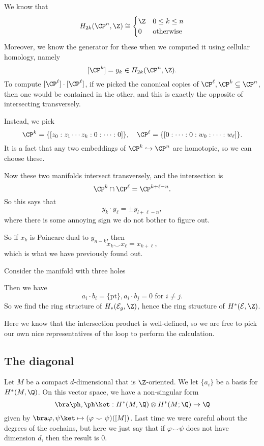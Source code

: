 \documentclass[a4paper]{article}
\begin{document}
\begin{eg}
  We know that
  \[
    H_{2k}(\CP^n, \Z) \cong
    \begin{cases}
      \Z & 0 \leq k \leq n\\
      0 & \text{otherwise}
    \end{cases}
  \]
  Moreover, we know the generator for these when we computed it using cellular homology, namely
  \[
    [\CP^k] = y_k \in H_{2k}(\CP^n, \Z).
  \]
  To compute $[\CP^\ell] \cdot [\CP^\ell]$, if we picked the canonical copies of $\CP^\ell, \CP^k \subseteq \CP^n$, then one would be contained in the other, and this is exactly the opposite of intersecting transversely.

  Instead, we pick
  \[
    \CP^k = \{[z_0:z_1 \cdots z_k:0:\cdots:0]\},\quad \CP^\ell = \{[0:\cdots : 0 : w_0 : \cdots : w_\ell]\}.
  \]
  It is a fact that any two embeddings of $\CP^k \hookrightarrow \CP^n$ are homotopic, so we can choose these.

  Now these two manifolds intersect transversely, and the intersection is
  \[
    \CP^k \cap \CP^\ell = \CP^{k + \ell - n}.
  \]
  So this says that
  \[
    y_k \cdot y_\ell = \pm y_{l + \ell - n},
  \]
  where there is some annoying sign we do not bother to figure out.

  So if $x_k$ is Poincare dual to $y_{n - k}$, then
  \[
    x_k \smile x_\ell = x_{k + \ell},
  \]
  which is what we have previously found out.
\end{eg}

\begin{eg}
  Consider the manifold with three holes

  Then we have
  \[
    a_i \cdot b_i = \{\mathrm{pt}\}, a_i \cdot b_j = 0\text{ for }i \not= j.
  \]
  So we find the ring structure of $H_*(\mathcal{E}_g, \Z)$, hence the ring structure of $H^*(\mathcal{E}, \Z)$.
\end{eg}
Here we know that the intersection product is well-defined, so we are free to pick our own nice representatives of the loop to perform the calculation.

\subsection{The diagonal}
Let $M$ be a compact $d$-dimensional that is $\Z$-oriented. We let $\{a_i\}$ be a basis for $H^*(M, \Q)$. On this vector space, we have a non-singular form
\[
  \bra \ph, \ph\ket: H^*(M, \Q) \otimes H^*(M; \Q) \to \Q
\]
given by $\bra \varphi, \psi\ket \mapsto (\varphi \smile \psi)([M])$. Last time we were careful about the degrees of the cochains, but here we just say that if $\varphi \smile \psi$ does not have dimension $d$, then the result is $0$.
\end{document}
